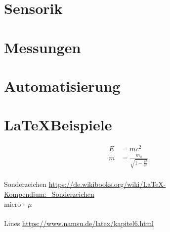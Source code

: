 \documentclass{scrartcl}
\begin{document}
\section{Sensorik}
\clearpage

\section{Messungen}
\clearpage

\section{Automatisierung}
\clearpage


\section{\LaTeX Beispiele}
\begin{align}
E &= mc^2                 \\
m &= \frac{m_0}{\sqrt{1-\frac{v^2}{c^2}}}
\end{align}
\\
Sonderzeichen
\url{https://de.wikibooks.org/wiki/LaTeX-Kompendium:_Sonderzeichen}\\
micro - $\mu$\\
\\
Lines
\url{https://www.namsu.de/latex/kapitel6.html}\\
\clearpage
\end{document}
